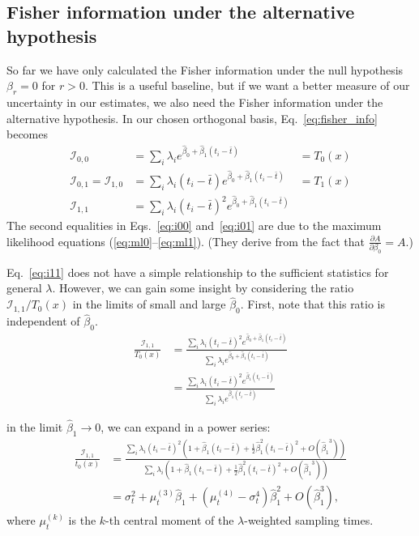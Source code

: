 \documentclass[12pt, letterpaper]{article}
\begin{document}
\subsection{Fisher information under the alternative hypothesis}

So far we have only calculated the Fisher information under the null hypothesis $\beta_r = 0$ for $r > 0$.
This is a useful baseline, but if we want a better measure of our uncertainty in our estimates, we also need the Fisher information under the alternative hypothesis.
In our chosen orthogonal basis, Eq.~\ref{eq:fisher_info} becomes
\begin{align}
    \mathcal{I}_{0,0} &= \sum_i \lambda_i e^{\hat{\beta}_0 + \hat{\beta}_1 (t_i - \bar{t})}
                      &= T_0(x) \label{eq:i00} \\
    \mathcal{I}_{0,1} = \mathcal{I}_{1,0} &= \sum_i \lambda_i (t_i - \bar{t}) e^{\hat{\beta}_0 + \hat{\beta}_1 (t_i - \bar{t})}
                                          &= T_1(x) \label{eq:i01} \\
    \mathcal{I}_{1,1} &= \sum_i \lambda_i {(t_i - \bar{t})}^2 e^{\hat{\beta}_0 + \hat{\beta}_1 (t_i - \bar{t})} \label{eq:i11}
\end{align}
The second equalities in Eqs.~\ref{eq:i00} and~\ref{eq:i01} are due to the maximum likelihood equations (\ref{eq:ml0}--\ref{eq:ml1}).
(They derive from the fact that $\frac{\partial A}{\partial \beta_0} = A$.)

Eq.~\ref{eq:i11} does not have a simple relationship to the sufficient statistics for general $\lambda$.
However, we can gain some insight by considering the ratio $\mathcal{I}_{1,1} / T_0(x)$ in the limits of small and large $\hat{\beta}_0$.
First, note that this ratio is independent of $\hat{\beta}_0$.
\begin{align}
    \frac{\mathcal{I}_{1,1}}{T_0(x)} &= \frac
        {\sum_i \lambda_i {(t_i - \bar{t})}^2 e^{\hat{\beta}_0 + \hat{\beta}_1 (t_i - \bar{t})}}
        {\sum_i \lambda_i e^{\hat{\beta}_0 + \hat{\beta}_1 (t_i - \bar{t})}} \\
                                     &= \frac
        {\sum_i \lambda_i {(t_i - \bar{t})}^2 e^{\hat{\beta}_1 (t_i - \bar{t})}}
        {\sum_i \lambda_i e^{\hat{\beta}_1 (t_i - \bar{t})}}
\end{align}

in the limit $\hat{\beta}_1 \to 0$, we can expand in a power series:
\begin{align}
    \frac{\mathcal{I}_{1,1}}{t_0(x)} &= \frac
        {\sum_i \lambda_i {(t_i - \bar{t})}^2 \left(1 + \hat{\beta}_1 (t_i - \bar{t}) + \frac{1}{2}\hat{\beta}_1^2 {(t_i - \bar{t})}^2 + O({\hat{\beta}_1}^3)\right)}
        {\sum_i \lambda_i \left(1 + \hat{\beta}_1 (t_i - \bar{t}) + \frac{1}{2}\hat{\beta}_1^2{(t_i - \bar{t})}^2 + O({\hat{\beta}_1}^3)\right)} \\
                                     &= \sigma_t^2 + \mu_t^{(3)} \hat{\beta}_1 + (\mu_t^{(4)} - \sigma_t^4) \hat{\beta}_1^2 + O(\hat{\beta}_1^3),
\end{align}
where $\mu_t^{(k)}$ is the $k$-th central moment of the $\lambda$-weighted sampling times.
\end{document}
